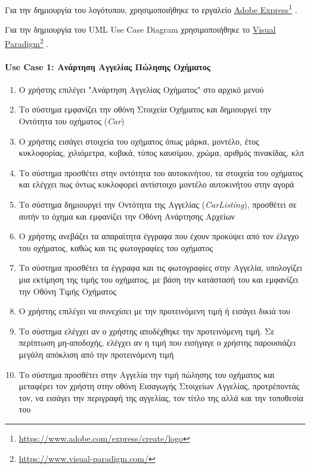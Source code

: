\documentclass{../ol-softwaremanual}
\newcommand{\doclink}[2]{\href{#1}{#2}\footnote{\url{#1}}}
\begin{document}
	Για την δημιουργία του λογότυπου, χρησιμοποιήθηκε το εργαλείο \en \doclink{https://www.adobe.com/express/create/logo}{Adobe Express} . \gr \break
	
	Για την δημιουργία του \en UML Use Case Diagram \gr χρησιμοποιήθηκε το \en \doclink{https://www.visual-paradigm.com/}{Visual Paradigm} . \gr \break 
	
	\newpage
	
	
	\paragraph{\en Use Case 1: \gr Ανάρτηση Αγγελίας Πώλησης Οχήματος}
	
	\begin{enumerate}		
		\item Ο χρήστης επιλέγει \en"\gr Ανάρτηση Αγγελίας Οχήματος\en" \gr στο αρχικό μενού
		\item Το σύστημα εμφανίζει την οθόνη Στοιχεία Οχήματος και δημιουργεί την Οντότητα του οχήματος (\en \textit{Car}\gr)		
		\item Ο χρήστης εισάγει στοιχεία του οχήματος όπως μάρκα, μοντέλο, έτος κυκλοφορίας, χιλιόμετρα, κυβικά, τύπος καυσίμου, χρώμα, αριθμός πινακίδας, κλπ		
		\item Το σύστημα προσθέτει στην οντότητα του αυτοκινήτου, τα στοιχεία του οχήματος και ελέγχει πως όντως κυκλοφορεί αντίστοιχο μοντέλο αυτοκινήτου στην αγορά 
		\item Το σύστημα δημιουργεί την Οντότητα της Αγγελίας (\en \textit{CarListing}\gr), προσθέτει σε αυτήν το όχημα και εμφανίζει την Οθόνη Ανάρτησης Αρχείων		
		\item Ο χρήστης ανεβάζει τα απαραίτητα έγγραφα που έχουν προκύψει από τον έλεγχο του οχήματος, καθώς και τις φωτογραφίες του οχήματος
		\item Το σύστημα προσθέτει τα έγγραφα και τις φωτογραφίες στην Αγγελία, υπολογίζει μια εκτίμηση της τιμής του οχήματος, με βάση την κατάστασή του και εμφανίζει την Οθόνη Τιμής Οχήματος
		\item Ο χρήστης επιλέγει να συνεχίσει με την προτεινόμενη τιμή ή εισάγει δικιά του				
		\item Το σύστημα ελέγχει αν ο χρήστης αποδέχθηκε την προτεινόμενη τιμή. Σε περίπτωση μη-αποδοχής, ελέγχει αν η τιμή που εισήγαγε ο χρήστης παρουσιάζει μεγάλη απόκλιση από την προτεινόμενη τιμή		
		\item Το σύστημα προσθέτει στην Αγγελία την τιμή πώλησης του οχήματος και μεταφέρει τον χρήστη στην οθόνη Εισαγωγής Στοιχείων Αγγελίας, προτρέποντάς τον, να εισάγει την περιγραφή της αγγελίας, τον τίτλο της αλλά και την τοποθεσία του		

\end{enumerate}
\end{document}
